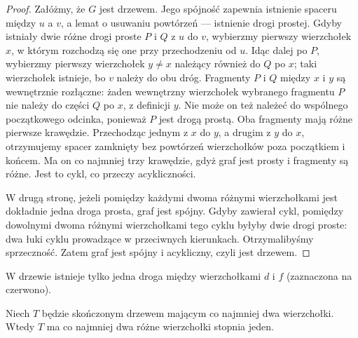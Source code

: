 \begin{proof}
Załóżmy, że $G$ jest drzewem. Jego spójność zapewnia
istnienie spaceru między $u$ a $v$, a lemat o usuwaniu
powtórzeń --- istnienie drogi prostej. Gdyby istniały
dwie różne drogi proste $P$ i $Q$ z $u$ do $v$,
wybierzmy pierwszy wierzchołek $x$, w którym
rozchodzą się one przy przechodzeniu od $u$.
Idąc dalej po $P$, wybierzmy pierwszy wierzchołek
$y\ne x$ należący również do $Q$ po $x$;
taki wierzchołek istnieje, bo $v$ należy do obu
dróg. Fragmenty $P$ i $Q$ między $x$ i $y$
są wewnętrznie rozłączne: żaden wewnętrzny
wierzchołek wybranego fragmentu $P$ nie należy
do części $Q$ po $x$, z definicji $y$. Nie może
on też należeć do wspólnego początkowego odcinka,
ponieważ $P$ jest drogą prostą.
Oba fragmenty mają różne pierwsze krawędzie.
Przechodząc jednym z $x$ do $y$, a drugim z $y$
do $x$, otrzymujemy spacer zamknięty bez powtórzeń
wierzchołków poza początkiem i końcem. Ma on
co najmniej trzy krawędzie, gdyż graf jest prosty
i fragmenty są różne. Jest to cykl, co przeczy
acykliczności.

W drugą stronę, jeżeli pomiędzy każdymi dwoma
różnymi wierzchołkami jest dokładnie jedna droga
prosta, graf jest spójny. Gdyby zawierał cykl,
pomiędzy dowolnymi dwoma różnymi wierzchołkami
tego cyklu byłyby dwie drogi proste: dwa łuki
cyklu prowadzące w przeciwnych kierunkach.
Otrzymalibyśmy sprzeczność. Zatem graf jest
spójny i acykliczny, czyli jest drzewem.
\end{proof}

\begin{center}

{\footnotesize W drzewie istnieje tylko jedna droga między
wierzchołkami $d$ i $f$ (zaznaczona na czerwono).}
\end{center}

\begin{lemat}
Niech $T$ będzie skończonym drzewem mającym
co najmniej dwa wierzchołki. Wtedy $T$ ma
co najmniej dwa różne wierzchołki stopnia jeden.
\end{lemat}


